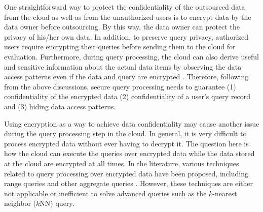\documentclass{article}
\begin{document}
One straightforward way to protect the confidentiality of 
the outsourced data from the cloud as well 
as from the unauthorized users is to encrypt data by the data owner before outsourcing\cite{abadi2009data,pearson2009privacy,li2012toward}. 
By this way, the data owner can protect the privacy of his/her own data. 
In addition, to preserve query privacy, authorized users require encrypting their queries before sending them to the cloud for evaluation.
Furthermore, during query processing,
 the cloud can also derive useful and sensitive information 
about the actual data items by observing the data access 
patterns even if the data and query are encrypted \cite{williams2008building,de2012managing}.
Therefore, following from the above discussions, secure query processing needs to guarantee (1) 
confidentiality of the encrypted data (2) 
confidentiality of a user's query record and (3) hiding data access patterns.

Using encryption as a way to achieve data confidentiality may cause another issue
during the query processing step in the cloud. In general, it is very
difficult to process encrypted data without ever having to decrypt it. 
The question here is how the cloud can execute the queries over encrypted data while the data stored at the 
cloud are encrypted at all times.
In the literature, various techniques related to query processing over 
encrypted data have been proposed, including range queries \cite{agrawal2004order,hore2004privacy,shi2007multi, hore2012secure} 
and other aggregate queries \cite{hacigumucs2004efficient,mykletun2006aggregation}.  
However, these techniques are either not applicable or inefficient to solve advanced queries such 
as the $k$-nearest neighbor ($k$NN) query. 
\end{document}
